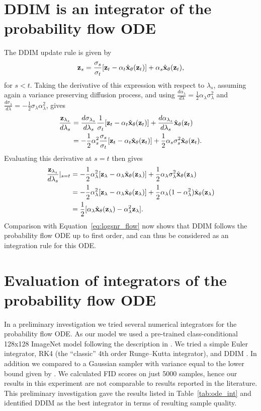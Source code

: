 \documentclass[hidelinks]{article} %
\begin{document}
\section{DDIM is an integrator of the probability flow ODE}
\label{app:ddim_ode}
The DDIM update rule \citep{song2020improved} is given by
\begin{align}
\mathbf{z}_s = \frac{\sigma_s}{\sigma_t}[\mathbf{z}_t - \alpha_t\hat{\mathbf{x}}_\theta(\mathbf{z}_t)] + \alpha_s\hat{\mathbf{x}}_\theta(\mathbf{z}_t),
\end{align}
for $s < t$.
Taking the derivative of this expression with respect to $\lambda_s$, assuming again a variance preserving diffusion process, and using $\frac{d\alpha_\lambda}{d\lambda}=\frac{1}{2}\alpha_{\lambda}\sigma^{2}_{\lambda}$ and $\frac{d\sigma_\lambda}{d\lambda}=-\frac{1}{2}\sigma_{\lambda}\alpha^{2}_{\lambda}$, gives
\begin{align}
\frac{\mathbf{z}_{\lambda_s}}{d\lambda_s} &= \frac{d\sigma_{\lambda_s}}{d\lambda_s}\frac{1}{\sigma_t}[\mathbf{z}_t - \alpha_t\hat{\mathbf{x}}_\theta(\mathbf{z}_t)] + \frac{d\alpha_{\lambda_s}}{d\lambda_s}\hat{\mathbf{x}}_\theta(\mathbf{z}_t)\\
&= -\frac{1}{2}\alpha_{s}^{2}\frac{\sigma_s}{\sigma_t}[\mathbf{z}_t - \alpha_t\hat{\mathbf{x}}_\theta(\mathbf{z}_t)] + \frac{1}{2}\alpha_s\sigma^{2}_s\hat{\mathbf{x}}_\theta(\mathbf{z}_t).
\end{align}
Evaluating this derivative at $s=t$ then gives
\begin{align}
\frac{\mathbf{z}_{\lambda_s}}{d\lambda_s}|_{s=t} &= -\frac{1}{2}\alpha_{\lambda}^{2}[\mathbf{z}_\lambda - \alpha_\lambda\hat{\mathbf{x}}_\theta(\mathbf{z}_\lambda)] + \frac{1}{2}\alpha_\lambda\sigma^{2}_\lambda\hat{\mathbf{x}}_\theta(\mathbf{z}_\lambda)\\
&= -\frac{1}{2}\alpha_{\lambda}^{2}[\mathbf{z}_\lambda - \alpha_\lambda\hat{\mathbf{x}}_\theta(\mathbf{z}_\lambda)] + \frac{1}{2}\alpha_\lambda(1-\alpha^2_\lambda)\hat{\mathbf{x}}_\theta(\mathbf{z}_\lambda)\\
&= \frac{1}{2}[\alpha_\lambda\hat{\mathbf{x}}_\theta(\mathbf{z}_\lambda) - \alpha_{\lambda}^{2}\mathbf{z}_\lambda].
\end{align}
Comparison with Equation~\ref{eq:logsnr_flow} now shows that DDIM follows the probability flow ODE up to first order, and can thus be considered as an integration rule for this ODE.

\section{Evaluation of integrators of the probability flow ODE}
\label{app:ode_integration}
In a preliminary investigation we tried several numerical integrators for the probability flow ODE. As our model we used a pre-trained class-conditional 128x128 ImageNet model following the description in \cite{ho2020denoising}. We tried a simple Euler integrator, RK4 (the ``classic'' 4th order Runge–Kutta integrator), and DDIM \citep{song2020denoising}. In addition we compared to a Gaussian sampler with variance equal to the lower bound given by \cite{ho2020denoising}. We calculated FID scores on just 5000 samples, hence our results in this experiment are not comparable to results reported in the literature. This preliminary investigation gave the results listed in Table~\ref{tab:ode_int} and identified DDIM as the best integrator in terms of resulting sample quality.
\end{document}
